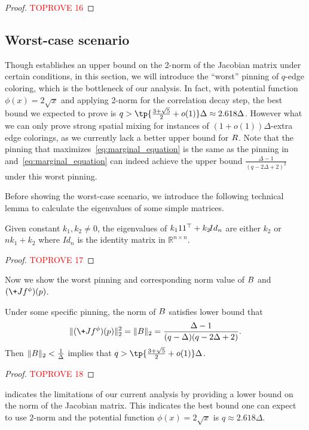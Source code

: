 \documentclass[a4paper,11pt]{article}
\begin{document}
\begin{proof}\textcolor{red}{TOPROVE 16}\end{proof}

\subsection{Worst-case scenario}\label{sec:limit}

Though  establishes an upper bound on the 2-norm of the Jacobian matrix under certain conditions, in this section, we will introduce the ``worst'' pinning of $q$-edge coloring, which is the bottleneck of our analysis. 
In fact, with potential function $\phi(x) = 2\sqrt x$ and applying 2-norm for the correlation decay step, the best bound we expected to prove is $q > \tp{\frac{3+\sqrt 5}{2}+ o(1)}\Delta\approx 2.618\Delta$. However what we can only prove strong spatial mixing for instances of $(1+o(1))\Delta$-extra edge colorings, as we currently lack a better upper bound for $\*R$.
Note that the pinning that maximizes~\cref{eq:marginal_equation} is the same as the pinning in~ and~\cref{eq:marginal_equation} can indeed achieve the upper bound $\frac{\Delta-1}{(q-2\Delta+2)^2}$ under this worst pinning.

Before showing the worst-case scenario, we introduce the following technical lemma to calculate the eigenvalues of some simple matrices.
\begin{lemma}\label{lem:calc_eigenvalues}
    Given constant $k_1,k_2\neq 0$, 
    the eigenvalues of $k_1\*1\*1^\top +k_2 \!{Id}_n$ are either $k_2$ or $nk_1 + k_2$ where $\!{Id}_n$ is the identity matrix in $\mathbb{R}^{n\times n}$.
\end{lemma}
\begin{proof}\textcolor{red}{TOPROVE 17}\end{proof}
Now we show the worst pinning and corresponding norm value of $\*B$ and $(\+J f^\phi)(\*p)$.
\begin{theorem}\label{thm:worst_pinning}
    Under some specific pinning, the norm of $\*B$ satisfies lower bound that
    $$
    \|(\+J f^\phi)(\*p)\|_2^2 = \|\*B\|_2 = \frac{\Delta-1}{(q-\Delta)(q-2\Delta+2)}.
    $$
    Then $\|\*B\|_2 < \frac 1\Delta$ implies that $q > \tp{\frac{3+\sqrt 5}{2}+o(1)}\Delta$.
\end{theorem}
\begin{proof}\textcolor{red}{TOPROVE 18}\end{proof}
 indicates the limitations of our current analysis by providing a lower bound on the norm of the Jacobian matrix. This indicates the best bound one can expect to use $2$-norm and the potential function $\phi(x) = 2\sqrt{x}$ is $q\approx 2.618\Delta$.
\end{document}
